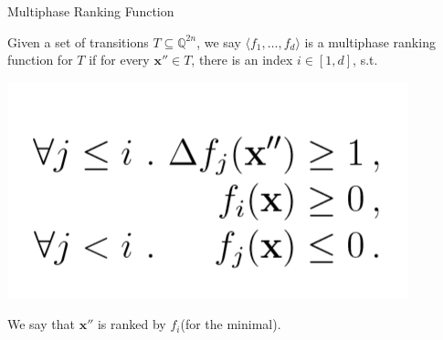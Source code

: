 \documentclass[11pt]{beamer}
\begin{document}
\begin{frame}{Multiphase Ranking Function}
\begin{definition}
Given a set of transitions $T\subseteq \mathbb{Q}^{2n}$, we say $\langle f_1, \ldots, f_d\rangle$ is a multiphase ranking function for $T$ if for every $\textbf{x}'' \in T$, there is an index $i\in [1, d]$, s.t.

\begin{center}
\includegraphics[scale = 0.3]{3.PNG}
\end{center}
We say that $\textbf{x}''$ is ranked by $f_i$(for the minimal).
\end{definition}


\end{frame}
\end{document}
